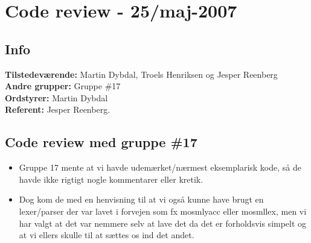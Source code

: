 \documentclass[a4paper,10pt,draft]{article}
\begin{document}
\section{Code review - 25/maj-2007}

\subsection{Info}

\textbf{Tilstedeværende:} Martin Dybdal, Troels Henriksen og Jesper Reenberg\\
\textbf{Andre grupper:} Gruppe \#17\\
\textbf{Ordstyrer:} Martin Dybdal\\
\textbf{Referent:} Jesper Reenberg.

\subsection{Code review med gruppe \#17}

\begin{itemize}

\item Gruppe 17 mente at vi havde udemærket/nærmest eksemplarisk kode, så de havde ikke rigtigt nogle kommentarer eller kretik.

\item Dog kom de med en henvisning til at vi også kunne have brugt en lexer/parser der var lavet i forvejen som fx mosmlyacc eller mosmllex, men vi har valgt at det var nemmere selv at lave det da det er forholdsvis simpelt og at vi ellers skulle til at sættes os ind  det andet.

\end{itemize}
\end{document}
